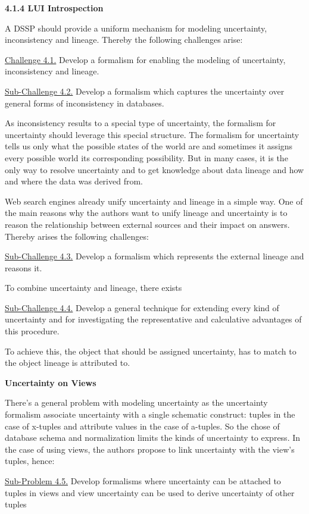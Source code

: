 \textbf{4.1.4 LUI Introspection}

A DSSP should provide a uniform mechanism for modeling uncertainty, inconsistency and lineage. Thereby the following challenges arise:

\uline{Challenge 4.1.}  Develop a formalism for enabling the modeling of uncertainty, inconsistency and lineage.

\uline{Sub-Challenge 4.2.}  Develop a formalism which captures the uncertainty over general forms of inconsistency in databases.

As inconsistency results to a special type of uncertainty, the formalism for uncertainty should leverage this special structure. The formalism for uncertainty tells us only what the possible states of the world are and sometimes it assigns every possible world its corresponding possibility. But in many cases, it is the only way to resolve uncertainty and to get knowledge about data lineage and how and where the data was derived from.

Web search engines already unify uncertainty and lineage in a simple way. One of the main reasons why the authors want to unify lineage and uncertainty is to reason the relationship between external sources and their impact on answers. Thereby arises the following challenges:

\uline{Sub-Challenge 4.3.}  Develop a formalism which represents the external lineage and reasons it.

To combine uncertainty and lineage, there exists

\uline{Sub-Challenge 4.4.}  Develop a general technique for extending every kind of uncertainty and for investigating the representative and calculative advantages of this procedure. 

To achieve this, the object that should be assigned uncertainty, has to match to the object lineage is attributed to. 

\textbf{Uncertainty on Views}

There's a general problem with modeling uncertainty as the uncertainty formalism associate uncertainty with a single schematic construct: tuples in the case of x-tuples and attribute values in the case of a-tuples. So the chose of database schema and normalization limits the kinds of uncertainty to express. In the case of using views, the authors propose to link uncertainty with the view's tuples, hence:

\uline{Sub-Problem 4.5.} Develop formalisms where uncertainty can be attached to tuples in views and view uncertainty can be used to derive uncertainty of other tuples

